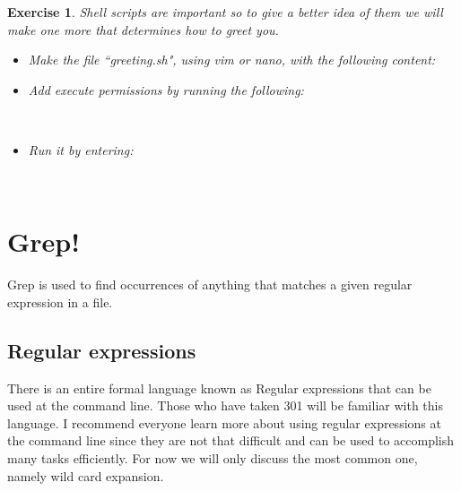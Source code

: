 \documentclass[oneside]{book}
\newcommand{\commandline}[1]{\begin{center} \colorbox{Dark}{\textcolor{white}{#1}} \end{center}}
\newtheorem{ex}{Exercise}[chapter]
\begin{document}
\begin{ex}
    Shell scripts are important so to give a better idea of them we will make one more that determines how to greet you. 
    \begin{itemize}
        \item Make the file ``greeting.sh", using vim or nano, with the following content:
        \item Add execute permissions by running the following:
            \commandline{chmod +x greeting.sh}
        \item Run it by entering:
            \commandline{./greeting.sh}
    \end{itemize}
\end{ex}


\section{Grep!}
    Grep is used to find occurrences of anything that matches a given regular expression in a file. 
\subsection{Regular expressions}
    There is an entire formal language known as Regular expressions that can be used at the command line. Those who have taken 301 will be familiar with this language. I recommend everyone learn more about using regular expressions at the command line since they are not that difficult and can be used to accomplish many tasks efficiently. For now we will only discuss the most common one, namely wild card expansion.
    
\end{document}
